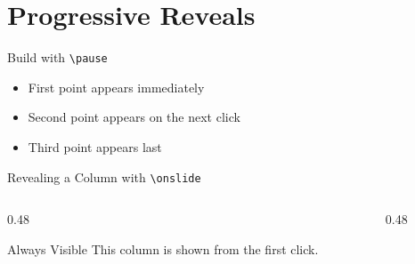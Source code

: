 \documentclass[aspectratio=169]{beamer}
\begin{document}
\section{Progressive Reveals}

\begin{frame}{Build with \texttt{\textbackslash pause}}
  \begin{itemize}
    \item First point appears immediately \pause
    \item Second point appears on the next click \pause
    \item Third point appears last
  \end{itemize}
\end{frame}

\begin{frame}{Revealing a Column with \texttt{\textbackslash onslide}}
  \begin{columns}[T]
    \begin{column}{0.48\textwidth}
      \begin{block}{Always Visible}
        {\small This column is shown from the first click.}
      \end{block}
    \end{column}
    \begin{column}{0.48\textwidth}
    \end{column}
  \end{columns}
\end{frame}
\end{document}
